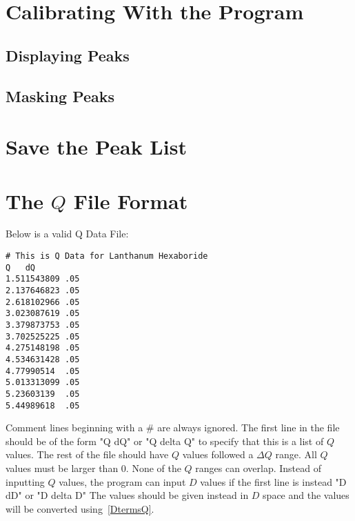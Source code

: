 \section{Calibrating With the Program}

\subsection{Displaying Peaks}

\subsection{Masking Peaks}

\section{Save the Peak List}

\section{The $Q$ File Format}\label{TheQValues}
Below is a valid Q Data File:
\begin{lstlisting}[caption={Lanthanum Hexaboride.dat},label=LaB6]
# This is Q Data for Lanthanum Hexaboride
Q   dQ
1.511543809 .05
2.137646823 .05
2.618102966 .05
3.023087619 .05
3.379873753 .05
3.702525225 .05
4.275148198 .05
4.534631428 .05
4.77990514  .05
5.013313099 .05
5.23603139  .05
5.44989618  .05
\end{lstlisting}
Comment lines beginning with a \# are always ignored. The
first line in the file should be of the form "Q  dQ" or "Q  delta Q" 
to specify that this is a list of $Q$ values. The rest of the
file should have $Q$ values followed a $\Delta Q$ range.
All $Q$ values must be larger than 0. None of the $Q$ ranges can 
overlap. Instead of inputting $Q$ values, the program can input
$D$ values if the first line is instead "D dD" or "D delta D"
The values should be given instead in $D$ space and the values
will be converted using~\ref{DtermsQ}.


